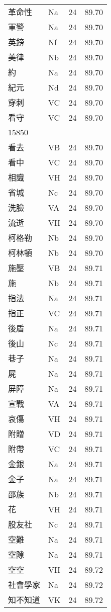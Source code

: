 \documentclass[twocolumn]{book}
\begin{document}
\begin{supertabular}{llrr}
革命性 & Na & 24 &  89.70\\
軍警 & Na & 24 &  89.70\\
英鎊 & Nf & 24 &  89.70\\
美律 & Nb & 24 &  89.70\\
約 & Na & 24 &  89.70\\
紀元 & Nd & 24 &  89.70\\
穿刺 & VC & 24 &  89.70\\
看守 & VC & 24 &  89.70\\
15850\\
看去 & VB & 24 &  89.70\\
看中 & VC & 24 &  89.70\\
相識 & VH & 24 &  89.70\\
省城 & Nc & 24 &  89.70\\
洗臉 & VA & 24 &  89.70\\
流逝 & VH & 24 &  89.70\\
柯格勒 & Nb & 24 &  89.70\\
柯林頓 & Nb & 24 &  89.70\\
施壓 & VB & 24 &  89.71\\
施 & Nb & 24 &  89.71\\
指法 & Na & 24 &  89.71\\
指正 & VC & 24 &  89.71\\
後盾 & Na & 24 &  89.71\\
後山 & Nc & 24 &  89.71\\
巷子 & Na & 24 &  89.71\\
屍 & Na & 24 &  89.71\\
屏障 & Na & 24 &  89.71\\
宣戰 & VA & 24 &  89.71\\
哀傷 & VH & 24 &  89.71\\
附贈 & VD & 24 &  89.71\\
附帶 & VC & 24 &  89.71\\
金銀 & Na & 24 &  89.71\\
金子 & Na & 24 &  89.71\\
邵族 & Nb & 24 &  89.71\\
花 & VH & 24 &  89.71\\
股友社 & Nc & 24 &  89.71\\
空難 & Na & 24 &  89.71\\
空隙 & Na & 24 &  89.71\\
空空 & VH & 24 &  89.72\\
社會學家 & Na & 24 &  89.72\\
知不知道 & VK & 24 &  89.72\\

\end{supertabular}
\end{document}

